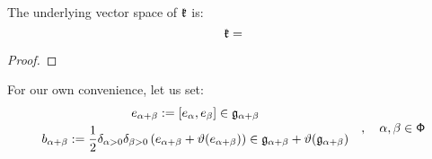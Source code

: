         \begin{lemma} \label{lemma: underlying_vector_spaces_of_pseudo_fixed_point_subalgebras}
            The underlying vector space of $\mathfrak{k}$ is:
                $$\mathfrak{k} = $$
        \end{lemma}
            \begin{proof}
                
            \end{proof}
        
        For our own convenience, let us set:
            $$
                \begin{gathered}
                    e_{\alpha + \beta} := [e_{\alpha}, e_{\beta}] \in \mathfrak{g}_{\alpha + \beta}
                    \\
                    b_{\alpha + \beta} := \frac12 \delta_{\alpha > 0} \delta_{\beta > 0} \left( e_{\alpha + \beta} + \vartheta(e_{\alpha + \beta}) \right) \in \mathfrak{g}_{\alpha + \beta} + \vartheta(\mathfrak{g}_{\alpha + \beta})
                \end{gathered}
                \quad, \quad \alpha, \beta \in \mathsf{\Phi}
            $$


